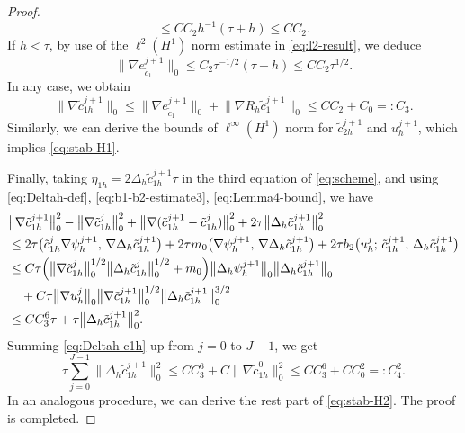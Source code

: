 \begin{proof}
\begin{equation}
  \leq CC_{2}h^{-1}(\tau+h) \leq CC_{2}.
\end{equation}
If $h < \tau$, by use of the $\ell^{2}(H^{1})$ norm estimate in \eqref{eq:l2-result}, we deduce
\begin{equation}\label{eq:grad-ec1-case2}
  \bigl\|\nabla e_{\tilde{c}_{1}}^{j+1}\bigr\|_{0}
  \leq C_{2}\tau^{-1/2}(\tau+h) \leq CC_{2}\tau^{1/2}.
\end{equation}
In any case, we obtain
\begin{equation}\label{eq:stab-c1}
  \bigl\|\nabla\tilde{c}_{1h}^{j+1}\bigr\|_{0}
  \leq \bigl\|\nabla e_{\tilde{c}_{1}}^{j+1}\bigr\|_{0}
     + \bigl\|\nabla R_{h}\tilde{c}_{1}^{j+1}\bigr\|_{0}
  \leq CC_{2} + C_{0} =: C_{3}.
\end{equation}
Similarly, we can derive the bounds of $\ell^{\infty}(H^{1})$ norm for
$\tilde{c}_{2h}^{j+1}$ and $u_{h}^{j+1}$, which implies \eqref{eq:stab-H1}.

Finally, taking $\eta_{1h} = 2\Delta_{h}\tilde{c}_{1h}^{j+1}\tau$ in the third equation
of \eqref{eq:scheme}, and using \eqref{eq:Deltah-def}, \eqref{eq:b1-b2-estimate3},
\eqref{eq:Lemma4-bound}, we have
\begin{align}
  &\bigl\|\nabla\tilde{c}_{1h}^{j+1}\bigr\|_{0}^{2}
   - \bigl\|\nabla\tilde{c}_{1h}^{j}\bigr\|_{0}^{2}
   + \bigl\|\nabla(\tilde{c}_{1h}^{j+1} - \tilde{c}_{1h}^{j})\bigr\|_{0}^{2}
   + 2\tau\bigl\|\Delta_{h}\tilde{c}_{1h}^{j+1}\bigr\|_{0}^{2}
  \nonumber\\
  &\leq 2\tau\bigl(\tilde{c}_{1h}^{j}\nabla\psi_{h}^{j+1},\,
                   \nabla\Delta_{h}\tilde{c}_{1h}^{j+1}\bigr)
       + 2\tau m_{0}\bigl(\nabla\psi_{h}^{j+1},\,
                           \nabla\Delta_{h}\tilde{c}_{1h}^{j+1}\bigr)
       + 2\tau b_{2}\bigl(u_{h}^{j};\, \tilde{c}_{1h}^{j+1},\,
                           \Delta_{h}\tilde{c}_{1h}^{j+1}\bigr)
  \nonumber\\
  &\leq C\tau\Bigl(\bigl\|\nabla\tilde{c}_{1h}^{j}\bigr\|_{0}^{1/2}
                   \bigl\|\Delta_{h}\tilde{c}_{1h}^{j}\bigr\|_{0}^{1/2}
                  + m_{0}\Bigr)
    \bigl\|\Delta_{h}\psi_{h}^{j+1}\bigr\|_{0}
    \bigl\|\Delta_{h}\tilde{c}_{1h}^{j+1}\bigr\|_{0}
  \nonumber\\
  &\quad + C\tau\bigl\|\nabla u_{h}^{j}\bigr\|_{0}
    \bigl\|\nabla\tilde{c}_{1h}^{j+1}\bigr\|_{0}^{1/2}
    \bigl\|\Delta_{h}\tilde{c}_{1h}^{j+1}\bigr\|_{0}^{3/2}
  \nonumber\\
  &\leq CC_{3}^{6}\tau + \tau\bigl\|\Delta_{h}\tilde{c}_{1h}^{j+1}\bigr\|_{0}^{2}.
  \label{eq:Deltah-c1h}
\end{align}
Summing \eqref{eq:Deltah-c1h} up from $j = 0$ to $J-1$, we get
\begin{equation}\label{eq:sum-Deltah-c1h}
  \tau\sum_{j=0}^{J-1}\bigl\|\Delta_{h}\tilde{c}_{1h}^{j+1}\bigr\|_{0}^{2}
  \leq CC_{3}^{6} + C\bigl\|\nabla\tilde{c}_{1h}^{0}\bigr\|_{0}^{2}
  \leq CC_{3}^{6} + CC_{0}^{2} =: C_{4}^{2}.
\end{equation}
In an analogous procedure, we can derive the rest part of \eqref{eq:stab-H2}. The proof is completed.
\end{proof}

